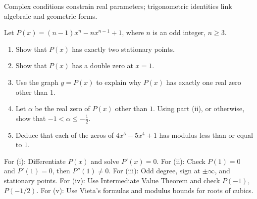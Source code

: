 \begin{takeaways}
Complex conditions constrain real parameters; trigonometric identities link algebraic and geometric forms.
\end{takeaways}

\vspace{1cm}

\begin{problem}
Let $P(x)=(n-1)x^n - nx^{n-1} + 1$, where $n$ is an odd integer, $n \ge 3$.
\begin{enumerate}
    \item[(i)] Show that $P(x)$ has exactly two stationary points.
    \item[(ii)] Show that $P(x)$ has a double zero at $x=1$.
    \item[(iii)] Use the graph $y=P(x)$ to explain why $P(x)$ has exactly one real zero other than $1$.
    \item[(iv)] Let $\alpha$ be the real zero of $P(x)$ other than $1$. Using part (ii), or otherwise, show that $-1 < \alpha \le -\frac{1}{2}$.
    \item[(v)] Deduce that each of the zeros of $4x^5 - 5x^4 + 1$ has modulus less than or equal to $1$.
\end{enumerate}
\end{problem}

\vspace{0.5cm}
\begin{hintbox}
For (i): Differentiate $P(x)$ and solve $P'(x)=0$. For (ii): Check $P(1)=0$ and $P'(1)=0$, then $P''(1)\neq 0$. For (iii): Odd degree, sign at $\pm\infty$, and stationary points. For (iv): Use Intermediate Value Theorem and check $P(-1)$, $P(-1/2)$. For (v): Use Vieta's formulas and modulus bounds for roots of cubics.
\end{hintbox}

